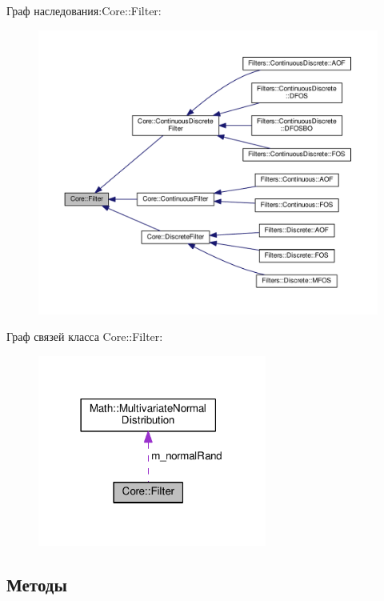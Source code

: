 Граф наследования\+:Core\+:\+:Filter\+:
\nopagebreak
\begin{figure}[H]
\begin{center}
\leavevmode
\includegraphics[width=350pt]{class_core_1_1_filter__inherit__graph}
\end{center}
\end{figure}


Граф связей класса Core\+:\+:Filter\+:
\nopagebreak
\begin{figure}[H]
\begin{center}
\leavevmode
\includegraphics[width=213pt]{class_core_1_1_filter__coll__graph}
\end{center}
\end{figure}


\subsection{Методы}
